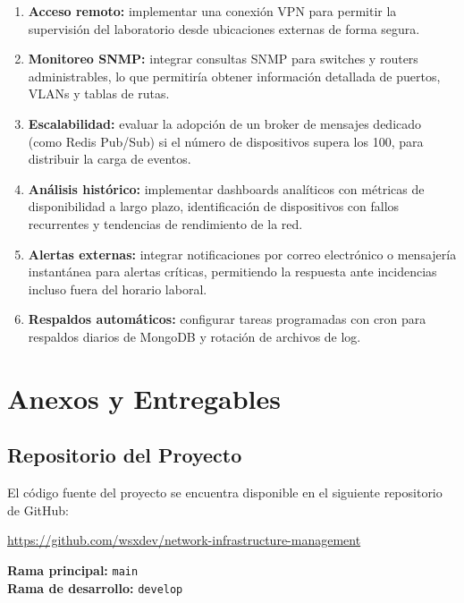 \documentclass[12pt,a4paper]{report}
\begin{document}
\begin{enumerate}
  \item \textbf{Acceso remoto:} implementar una conexión VPN para permitir la supervisión del laboratorio desde ubicaciones externas de forma segura.
  \item \textbf{Monitoreo SNMP:} integrar consultas SNMP para switches y routers administrables, lo que permitiría obtener información detallada de puertos, VLANs y tablas de rutas.
  \item \textbf{Escalabilidad:} evaluar la adopción de un broker de mensajes dedicado (como Redis Pub/Sub) si el número de dispositivos supera los 100, para distribuir la carga de eventos.
  \item \textbf{Análisis histórico:} implementar dashboards analíticos con métricas de disponibilidad a largo plazo, identificación de dispositivos con fallos recurrentes y tendencias de rendimiento de la red.
  \item \textbf{Alertas externas:} integrar notificaciones por correo electrónico o mensajería instantánea para alertas críticas, permitiendo la respuesta ante incidencias incluso fuera del horario laboral.
  \item \textbf{Respaldos automáticos:} configurar tareas programadas con cron para respaldos diarios de MongoDB y rotación de archivos de log.
\end{enumerate}

\chapter{Anexos y Entregables}

\section{Repositorio del Proyecto}

El código fuente del proyecto se encuentra disponible en el siguiente repositorio de GitHub:

\begin{center}
\url{https://github.com/wsxdev/network-infrastructure-management}
\end{center}

\textbf{Rama principal:} \texttt{main}\\
\textbf{Rama de desarrollo:} \texttt{develop}
\end{document}
